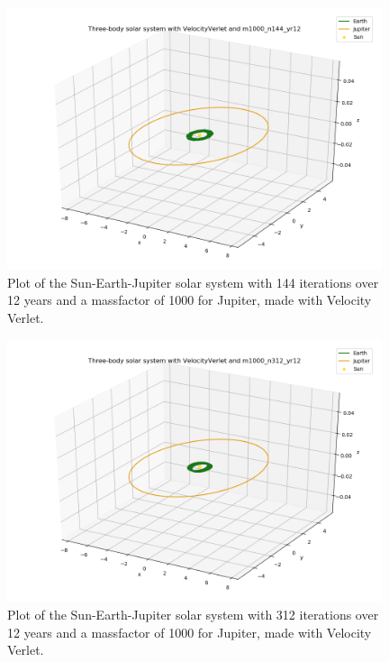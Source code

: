 \documentclass{article}
\begin{document}
    \begin{figure}[H]
        \centering
        \includegraphics[width = 11cm]{img/plot3D_S_E_J_V_m1000_n144_yr12.png}
        \caption{Plot of the Sun-Earth-Jupiter solar system with 144 iterations over 12 years and a massfactor of 1000 for Jupiter, made with Velocity Verlet.}
        \label{fig:plot3D_S_E_J_V_m1000_n144_yr12}
    \end{figure}

    \begin{figure}[H]
        \centering
        \includegraphics[width = 11cm]{img/plot3D_S_E_J_V_m1000_n312_yr12.png}
        \caption{Plot of the Sun-Earth-Jupiter solar system with 312 iterations over 12 years and a massfactor of 1000 for Jupiter, made with Velocity Verlet.}
        \label{fig:plot3D_S_E_J_V_m1000_n312_yr12}
    \end{figure}
\end{document}
